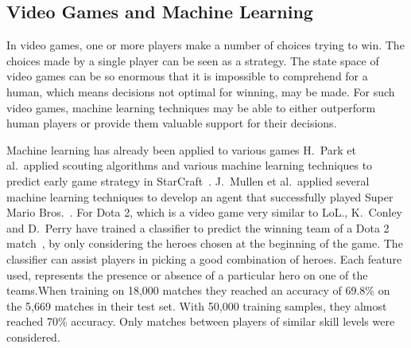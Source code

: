 \subsection{Video Games and Machine Learning}\label{sec:mlandonlinevideogames}
In video games, one or more players make a number of choices trying to win. The choices made by a single player can be seen as a strategy. The state space of video games can be so enormous that it is impossible to comprehend for a human, which means decisions not optimal for winning, may be made. For such video games, machine learning techniques may be able to either outperform human players or provide them valuable support for their decisions.

Machine learning has already been applied to various games H.\ Park et al.\ applied scouting algorithms and various machine learning techniques to predict early game strategy in StarCraft~\cite{Park:2012:PES:2425296.2425298}. J.\ Mullen et al.\ applied several machine learning techniques to develop an agent that successfully played Super Mario Bros.~\cite{supermario}. For Dota 2, which is a video game very similar to LoL.\@, K.\ Conley and D.\ Perry have trained a classifier to predict the winning team of a Dota 2 match~\cite{dota2article}, by only considering the heroes chosen at the beginning of the game. The classifier can assist players in picking a good combination of heroes. Each feature used, represents the presence or absence of a particular hero on one of the teams.When training on 18,000 matches they reached an accuracy of 69.8\% on the 5,669 matches in their test set. With 50,000 training samples, they almost reached 70\% accuracy. Only matches between players of similar skill levels were considered.

%
%



